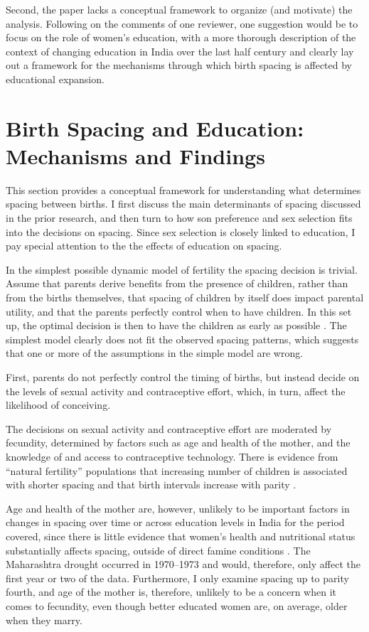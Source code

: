 Second, the paper lacks a conceptual framework to organize (and
motivate) the analysis. Following on the comments of one reviewer, one
suggestion would be to focus on the role of women’s education, with a
more thorough description of the context of changing education in India
over the last half century and clearly lay out a framework for the
mechanisms through which birth spacing is affected by educational
expansion.

\section{Birth Spacing and Education: Mechanisms and Findings}

This section provides a conceptual framework for understanding what determines spacing 
between births.
I first discuss the main determinants of spacing discussed in the prior research, and 
then turn to how son preference and sex selection fits into the decisions on spacing.
Since sex selection is closely linked to education, I pay special attention to the
the effects of education on spacing.

In the simplest possible dynamic model of fertility the spacing decision is trivial.
Assume that parents derive benefits from the presence of children, rather than from 
the births themselves, that spacing of children by itself does impact parental utility, 
and that the parents perfectly control when to have children. 
In this set up, the optimal decision is then to have the children as early as possible 
\citep{Newman1988}.
The simplest model clearly does not fit the observed spacing patterns, which suggests 
that one or more of the assumptions in the simple model are wrong.

First, parents do not perfectly control the timing of births, but instead decide on the
levels of sexual activity and contraceptive effort, which, in turn, affect the 
likelihood of conceiving.

The decisions on sexual activity and contraceptive effort are moderated by fecundity,
determined by factors such as age and health of the mother, and the knowledge of and 
access to contraceptive technology.
There is evidence from ``natural fertility'' populations that increasing number of 
children is associated with shorter spacing and that birth intervals increase 
with parity \citep{Henry1961,Leridon1977}.

Age and health of the mother are, however, unlikely to be important factors in changes
in spacing over time or across education levels in India for the period covered, since
there is little evidence that women's health and nutritional status substantially affects 
spacing, outside of direct famine conditions \citep{Huffman1987,John1987,lindstrom99}.
The Maharashtra drought occurred in 1970--1973 and would, therefore, only affect the first
year or two of the data.
Furthermore, I only examine spacing up to parity fourth, and age of the mother is,
therefore, unlikely to be a concern when it comes to fecundity, even though better 
educated women are, on average, older when they marry. 

